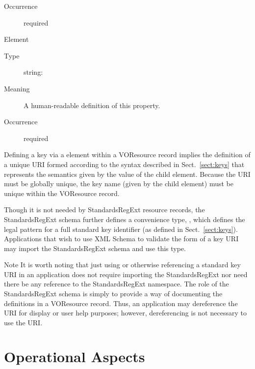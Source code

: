 \documentclass[11pt,a4paper]{ivoa}
\begin{document}
\begin{generated}
\begin{bigdescription}
\begin{description}
\item[Occurrence] required


\end{description}
\item[Element \xmlel{description}]
\begin{description}
\item[Type] string: 
\item[Meaning] 
                  A human-readable definition of this property.
               
\item[Occurrence] required

\end{description}


\end{bigdescription}\endgroup

\endgroup
\end{generated}



Defining a key via a  element within a
VOResource record implies the definition of a unique URI formed
according to the syntax described in Sect.~\ref{sect:keys}
that represents the semantics given by the value of the
 child element.  Because the URI must
be globally unique, the key name (given by the
 child element) must be unique within the
VOResource record.

Though it is not needed by StandardsRegExt resource records, the StandardsRegExt
schema further defines a convenience type,
, which defines the legal pattern for
a full standard key identifier (as defined in
Sect.~\ref{sect:keys}).  Applications that wish to use
XML Schema to validate the form of a key URI may import the StandardsRegExt
schema and use this type.


\begin{admonition}{Note}
It is worth noting that just using or otherwise referencing a
standard key URI in an application does not require importing
the StandardsRegExt nor need there be any reference to the
StandardsRegExt namespace.  The role of the StandardsRegExt schema is
simply to provide a way of documenting the definitions in a
VOResource record.  Thus, an application may dereference the
URI for display or user help purposes; however, dereferencing
is not necessary to use the URI.
\end{admonition}

\section{Operational Aspects}
\label{sect:operations}
\end{document}
